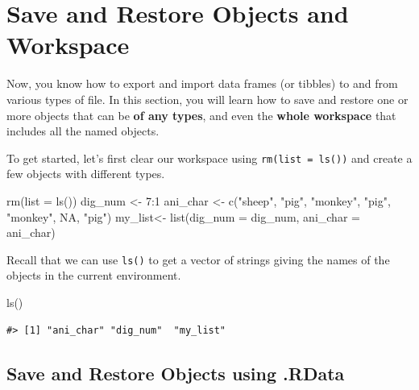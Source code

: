 \documentclass[
]{book}
\newenvironment{Shaded}{\begin{snugshade}}{\end{snugshade}}
\newcommand{\AttributeTok}[1]{\textcolor[rgb]{0.77,0.63,0.00}{#1}}
\newcommand{\ConstantTok}[1]{\textcolor[rgb]{0.00,0.00,0.00}{#1}}
\newcommand{\DecValTok}[1]{\textcolor[rgb]{0.00,0.00,0.81}{#1}}
\newcommand{\FunctionTok}[1]{\textcolor[rgb]{0.00,0.00,0.00}{#1}}
\newcommand{\NormalTok}[1]{#1}
\newcommand{\OtherTok}[1]{\textcolor[rgb]{0.56,0.35,0.01}{#1}}
\newcommand{\SpecialCharTok}[1]{\textcolor[rgb]{0.00,0.00,0.00}{#1}}
\newcommand{\StringTok}[1]{\textcolor[rgb]{0.31,0.60,0.02}{#1}}
\begin{document}
\hypertarget{save-object}{%
\section{Save and Restore Objects and Workspace}\label{save-object}}

Now, you know how to export and import data frames (or tibbles) to and from various types of file. In this section, you will learn how to save and restore one or more objects that can be \textbf{of any types}, and even the \textbf{whole workspace} that includes all the named objects.

To get started, let's first clear our workspace using \texttt{rm(list\ =\ ls())} and create a few objects with different types.

\begin{Shaded}
\begin{Highlighting}[]
\FunctionTok{rm}\NormalTok{(}\AttributeTok{list =} \FunctionTok{ls}\NormalTok{())}
\NormalTok{dig\_num }\OtherTok{\textless{}{-}} \DecValTok{7}\SpecialCharTok{:}\DecValTok{1}
\NormalTok{ani\_char }\OtherTok{\textless{}{-}} \FunctionTok{c}\NormalTok{(}\StringTok{"sheep"}\NormalTok{, }\StringTok{"pig"}\NormalTok{, }\StringTok{"monkey"}\NormalTok{, }\StringTok{"pig"}\NormalTok{, }\StringTok{"monkey"}\NormalTok{, }\ConstantTok{NA}\NormalTok{, }\StringTok{"pig"}\NormalTok{)}
\NormalTok{my\_list}\OtherTok{\textless{}{-}} \FunctionTok{list}\NormalTok{(}\AttributeTok{dig\_num =}\NormalTok{ dig\_num, }\AttributeTok{ani\_char =}\NormalTok{ ani\_char)}
\end{Highlighting}
\end{Shaded}

Recall that we can use \texttt{ls()} to get a vector of strings giving the names of the objects in the current environment.

\begin{Shaded}
\begin{Highlighting}[]
\FunctionTok{ls}\NormalTok{()}
\end{Highlighting}
\end{Shaded}

\begin{verbatim}
#> [1] "ani_char" "dig_num"  "my_list"
\end{verbatim}

\hypertarget{save-and-restore-objects-using-.rdata}{%
\subsection{Save and Restore Objects using .RData}\label{save-and-restore-objects-using-.rdata}}
\end{document}
